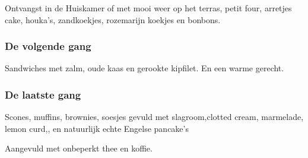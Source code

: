 Ontvangst in de Huiskamer of met mooi weer op het terras,
petit four, arretjes cake, houka’s, zandkoekjes, rozemarijn koekjes
en bonbons.

\subsubsection*{De volgende gang}

Sandwiches met zalm, oude kaas en gerookte kipfilet.
En een warme gerecht.

\subsubsection*{De laatste gang}
Scones, muffins, brownies, soesjes gevuld met slagroom,clotted cream, marmelade, lemon curd,, en natuurlijk echte Engelse pancake’s

Aangevuld met onbeperkt thee en koffie.
